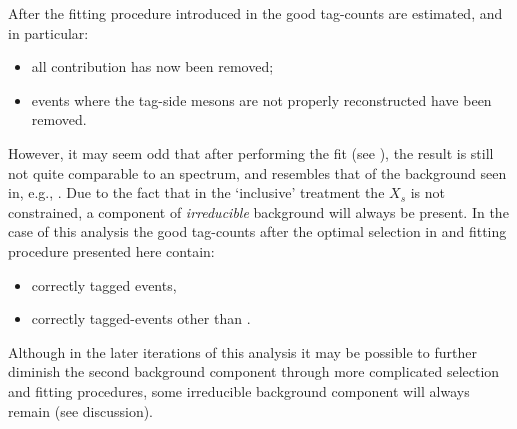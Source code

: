 After the fitting procedure introduced in  the good tag-\B counts are estimated, and in particular:
\begin{itemize}
    \item all \epem\ra\qqbar contribution has now been removed;
    \item events where the tag-side \B mesons are not properly reconstructed have been removed.
\end{itemize}

However, it may seem odd that after performing the \Mbc fit (see ), the result is still not quite comparable to an \EB spectrum,
and resembles that of the background seen in, e.g., .
Due to the fact that in the `inclusive' treatment the $X_s$ is not constrained, a component of \textit{irreducible} background will always be present.
In the case of this analysis the good tag-\B counts after the optimal selection in  and fitting procedure presented here contain:
\begin{itemize}
    \item correctly tagged \BtoXsgamma events,
    \item correctly tagged-\BB events other than \BtoXsgamma.
\end{itemize}
Although in the later iterations of this analysis it may be possible to further diminish the second background component through more complicated selection and fitting procedures, 
some irreducible background component will always remain (see discussion).

